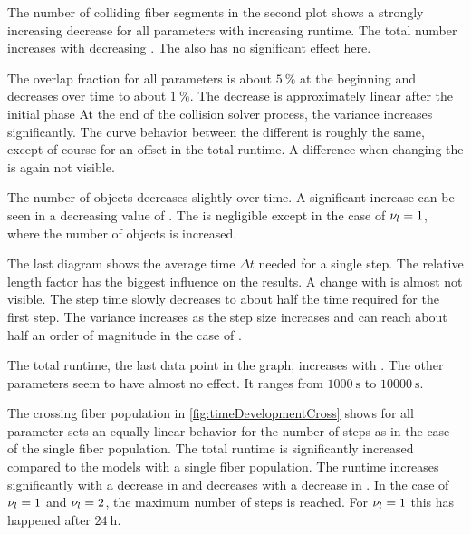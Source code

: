 \par
%
The number of colliding fiber segments in the second plot shows a strongly increasing decrease for all parameters with increasing runtime.
The total number increases with decreasing \segLengthFactor{}.
The \segRadiusFactor{} also has no significant effect here.
\par
%
The overlap fraction for all parameters is about $\SI{5}{\percent}$ at the beginning and decreases over time to about $\SI{1}{\percent}$.
The decrease is approximately linear after the initial phase
At the end of the collision solver process, the variance increases significantly.
The curve behavior between the different \segLengthFactor{} is roughly the same, except of course for an offset in the total runtime.
A difference when changing the \segRadiusFactor{} is again not visible.
\par
%
The number of objects decreases slightly over time.
A significant increase can be seen in a decreasing value of \segLengthFactor{}.
The \segRadiusFactor{} is negligible except in the case of $\textnormal{$\nu_{l}$} = \SI{1}{}$, where the number of objects is increased.
\par
%
The last diagram shows the average time $\Delta t$ needed for a single step.
The relative length factor \segLengthFactor{} has the biggest influence on the results.
A change with \segRadiusFactor{} is almost not visible.
The step time slowly decreases to about half the time required for the first step.
The variance increases as the step size increases and can reach about half an order of magnitude in the case of \segLengthFactor{}.
\par
%
The total runtime, \ie{} the last data point in the graph, increases with \segLengthFactor{}.
The other parameters seem to have almost no effect.
It ranges from $\SI{1000}{\second}$ to $\SI{10000}{\second}$.
\par
%
The crossing fiber population \cfbs{} in \cref{fig:timeDevelopmentCross} shows for all parameter sets an equally linear behavior for the number of steps as in the case of the single fiber population.
The total runtime is significantly increased compared to the models with a single fiber population.
The runtime increases significantly with a decrease in \segLengthFactor{} and decreases with a decrease in \segRadiusFactor{}.
In the case of $\textnormal{$\nu_{l}$} = \SI{1}{}$ and $\textnormal{$\nu_{l}$} = \SI{2}{}$, the maximum number of steps is reached.
For $\textnormal{$\nu_{l}$} = \SI{1}{}$ this has happened after $\SI{24}{\hour}$.
\par
